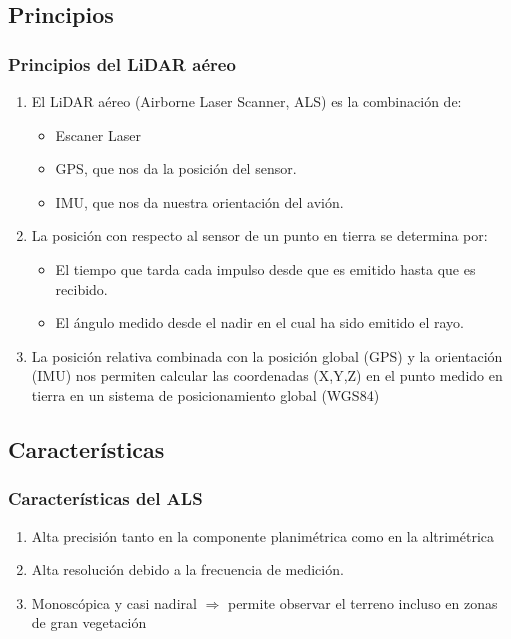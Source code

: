 \subsection{Principios}
\begin{frame}
 \frametitle{Principios del LiDAR aéreo}
 \begin{enumerate}
   \item El LiDAR aéreo (Airborne Laser Scanner, \alert{ALS}) es la combinación de:
    	\begin{itemize}
    	 \item \alert{Escaner Laser}
    	 \item \alert{GPS}, que nos da la posición del sensor.
    	 \item \alert{IMU}, que nos da nuestra orientación del avión.
    	\end{itemize}
   \item La posición con respecto al sensor de un punto en tierra se determina por:
     \begin{itemize}
       \item El \alert{tiempo} que tarda cada impulso desde que es emitido hasta que es recibido.
       \item El \alert{ángulo} medido desde el nadir en el cual ha sido emitido el rayo.
     \end{itemize}
   \item La posición relativa combinada con la posición global (\alert{GPS}) y la orientación (\alert{IMU}) nos permiten calcular las coordenadas (X,Y,Z) en el punto medido en tierra en un sistema de posicionamiento global (WGS84)
 \end{enumerate}
\end{frame}
\subsection{Características}
\begin{frame}[label=lidar_charact]
   \frametitle{Características del ALS}
   \begin{enumerate}
     	\item \alert{Alta precisión} tanto en la componente planimétrica como en la altrimétrica
     	\item \alert{Alta resolución} debido a la frecuencia de medición.
     	\item \alert{Monoscópica} y casi \alert{nadiral} $\Rightarrow$ permite observar el terreno incluso en zonas de gran vegetación
   \end{enumerate}
\end{frame}
